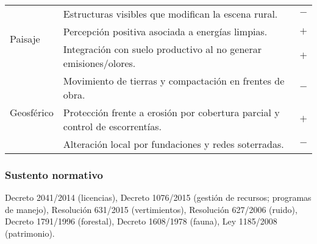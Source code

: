 \begin{table}[h]
\begin{tabular}{|l|p{10cm}|c|}
\multirow{3}{*}{Paisaje} 
& Estructuras visibles que modifican la escena rural. & $-$\\
& Percepción positiva asociada a energías limpias. & $+$\\
& Integración con suelo productivo al no generar emisiones/olores. & $+$\\ \hline
\multirow{3}{*}{Geosférico} 
& Movimiento de tierras y compactación en frentes de obra. & $-$\\
& Protección frente a erosión por cobertura parcial y control de escorrentías. & $+$\\
& Alteración local por fundaciones y redes soterradas. & $-$\\ \hline
\end{tabular}
\end{table}

\subsubsection*{Sustento normativo}
Decreto 2041/2014 (licencias), Decreto 1076/2015 (gestión de recursos; programas de manejo), Resolución 631/2015 (vertimientos), Resolución 627/2006 (ruido), Decreto 1791/1996 (forestal), Decreto 1608/1978 (fauna), Ley 1185/2008 (patrimonio).
